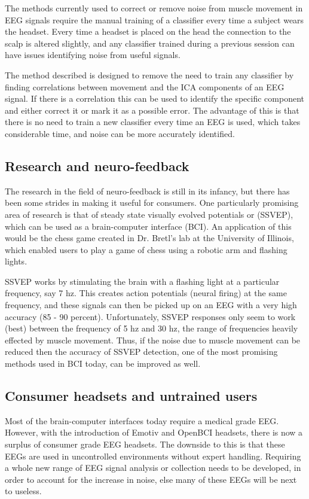 \documentclass{acm_proc_article-sp}
\begin{document}
The methods currently used to correct or remove noise from muscle
movement in EEG signals require the manual training of a classifier
every time a subject wears the headset. Every time a headset is placed
on the head the connection to the scalp is altered slightly, and any
classifier trained during a previous session can have issues
identifying noise from useful signals.

The method described is designed to remove the need to train any
classifier by finding correlations between movement and the ICA
components of an EEG signal. If there is a correlation this can be
used to identify the specific component and either correct it or
mark it as a possible error. The advantage of this is that there is no
need to train a new classifier every time an EEG is used, which takes
considerable time, and noise can be more accurately identified.

\subsection*{Research and neuro-feedback}
The research in the field of neuro-feedback is still in its infancy,
but there has been some strides in making it useful for consumers. One
particularly promising area of research is that of steady state
visually evolved potentials or (SSVEP), which can be used as a
brain-computer interface (BCI). An application of this would be the
chess game created in Dr. Bretl's lab at the University of
Illinois\cite{akhtar2014}, which enabled users to play a game of chess
using a robotic arm and flashing lights.

SSVEP works by stimulating the brain with a flashing light at a
particular frequency, say 7 hz. This creates action potentials (neural
firing) at the same frequency, and these signals can then be picked up
on an EEG with a very high accuracy (85 - 90 percent). Unfortunately,
SSVEP responses only seem to work (best) between the frequency of 5 hz
and 30 hz, the range of frequencies heavily effected by muscle
movement. Thus, if the noise due to muscle movement can be reduced
then the accuracy of SSVEP detection, one of the most promising
methods used in BCI today, can be improved as well.

\subsection*{Consumer headsets and untrained users}
Most of the brain-computer interfaces today require a medical grade
EEG. However, with the introduction of Emotiv and OpenBCI headsets,
there is now a surplus of consumer grade EEG headsets. The
downside to this is that these EEGs are used in uncontrolled
environments without expert handling. Requiring a whole new range of
EEG signal analysis or collection needs to be developed, in order to
account for the increase in noise, else many of these EEGs will be
next to useless.
\end{document}
